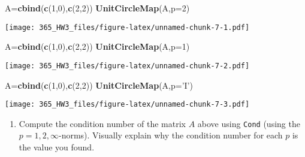 \documentclass[]{article}
\newenvironment{Shaded}{\begin{snugshade}}{\end{snugshade}}
\newcommand{\DataTypeTok}[1]{\textcolor[rgb]{0.13,0.29,0.53}{#1}}
\newcommand{\DecValTok}[1]{\textcolor[rgb]{0.00,0.00,0.81}{#1}}
\newcommand{\KeywordTok}[1]{\textcolor[rgb]{0.13,0.29,0.53}{\textbf{#1}}}
\newcommand{\NormalTok}[1]{#1}
\newcommand{\StringTok}[1]{\textcolor[rgb]{0.31,0.60,0.02}{#1}}
\providecommand{\tightlist}{%
  \setlength{\itemsep}{0pt}\setlength{\parskip}{0pt}}
\begin{document}
\begin{Shaded}
\begin{Highlighting}[]
\NormalTok{A=}\KeywordTok{cbind}\NormalTok{(}\KeywordTok{c}\NormalTok{(}\DecValTok{1}\NormalTok{,}\DecValTok{0}\NormalTok{),}\KeywordTok{c}\NormalTok{(}\DecValTok{2}\NormalTok{,}\DecValTok{2}\NormalTok{))}
\KeywordTok{UnitCircleMap}\NormalTok{(A,}\DataTypeTok{p=}\DecValTok{2}\NormalTok{)}
\end{Highlighting}
\end{Shaded}

\texttt{[image: 365\_HW3\_files/figure-latex/unnamed-chunk-7-1.pdf]}

\begin{Shaded}
\begin{Highlighting}[]
\NormalTok{A=}\KeywordTok{cbind}\NormalTok{(}\KeywordTok{c}\NormalTok{(}\DecValTok{1}\NormalTok{,}\DecValTok{0}\NormalTok{),}\KeywordTok{c}\NormalTok{(}\DecValTok{2}\NormalTok{,}\DecValTok{2}\NormalTok{))}
\KeywordTok{UnitCircleMap}\NormalTok{(A,}\DataTypeTok{p=}\DecValTok{1}\NormalTok{)}
\end{Highlighting}
\end{Shaded}

\texttt{[image: 365\_HW3\_files/figure-latex/unnamed-chunk-7-2.pdf]}

\begin{Shaded}
\begin{Highlighting}[]
\NormalTok{A=}\KeywordTok{cbind}\NormalTok{(}\KeywordTok{c}\NormalTok{(}\DecValTok{1}\NormalTok{,}\DecValTok{0}\NormalTok{),}\KeywordTok{c}\NormalTok{(}\DecValTok{2}\NormalTok{,}\DecValTok{2}\NormalTok{))}
\KeywordTok{UnitCircleMap}\NormalTok{(A,}\DataTypeTok{p=}\StringTok{'I'}\NormalTok{)}
\end{Highlighting}
\end{Shaded}

\texttt{[image: 365\_HW3\_files/figure-latex/unnamed-chunk-7-3.pdf]}

\begin{enumerate}
\def\labelenumi{(\alph{enumi})}
\setcounter{enumi}{1}
\tightlist
\item
  Compute the condition number of the matrix \(A\) above using
  \texttt{Cond} (using the \(p=1,2, \infty\)-norms). Visually explain
  why the condition number for each \(p\) is the value you found.
\end{enumerate}
\end{document}
